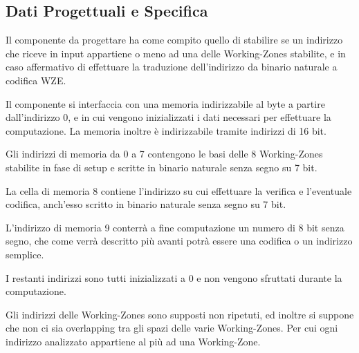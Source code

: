 \documentclass{article}
\begin{document}
\subsection{Dati Progettuali e Specifica}
\begin{flushleft}

Il componente da progettare ha come compito quello di stabilire se un indirizzo che riceve in input appartiene o meno ad una delle Working-Zones stabilite, e in caso affermativo di effettuare la traduzione dell'indirizzo da binario naturale a codifica WZE.

\medskip

Il componente si interfaccia con una memoria indirizzabile al byte a partire dall'indirizzo 0, e in cui vengono inizializzati i dati necessari per effettuare la computazione. La memoria inoltre è indirizzabile tramite indirizzi di 16 bit.

\medskip

Gli indirizzi di memoria da 0 a 7 contengono le basi delle 8 Working-Zones stabilite in fase di setup e scritte in binario naturale senza segno su 7 bit.
\smallskip

La cella di memoria 8 contiene l'indirizzo su cui effettuare la verifica e l'eventuale codifica, anch'esso scritto in binario naturale senza segno su 7 bit.
\smallskip

L'indirizzo di memoria 9 conterrà a fine computazione un numero di 8 bit senza segno, che come verrà descritto più avanti potrà essere una codifica o un indirizzo semplice.

\medskip

I restanti indirizzi sono tutti inizializzati a 0 e non vengono sfruttati durante la computazione.

\medskip

Gli indirizzi delle Working-Zones sono supposti non ripetuti, ed inoltre si suppone che non ci sia overlapping tra gli spazi delle varie Working-Zones. Per cui ogni indirizzo analizzato appartiene al più ad una Working-Zone.

\end{flushleft}

\bigskip
\end{document}
